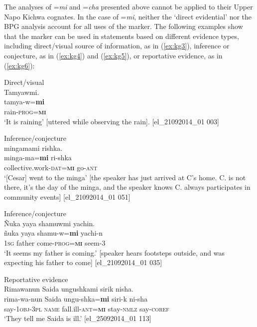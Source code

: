 \documentclass[output=paper]{langscibook}
\begin{document}
The analyses of =\textit{mi} and =\textit{cha} presented above cannot be applied to their Upper Napo Kichwa cognates. In the case of =\textit{mi}, neither the ‘direct evidential’ nor the BPG analysis account for all uses of the marker. The following examples show that the marker can be used in statements based on different evidence types, including direct/visual source of information, as in (\ref{ex:kg3}), inference or conjecture, as in (\ref{ex:kg4}) and (\ref{ex:kg5}), or reportative evidence, as in (\ref{ex:kg6}):

\begin{exe}
	\ex Direct/visual\label{ex:kg3}\\
	\glll Tamyawmi.\\
	tamya-w=\textbf{mi}\\
	rain-\textsc{prog}=\textbf{\textsc{mi}}\\
	\trans ‘It is raining’ [uttered while observing the rain]. [el\_21092014\_01 003]
\end{exe}

\begin{exe}
	\ex Inference/conjecture\label{ex:kg4}\\
	\glll [Cesar] mingamami rishka.\\
	[Cesar] minga-ma=\textbf{mi} ri-shka\\
	[Cesar] collective.work-\textsc{dat}=\textbf{\textsc{mi}} go-\textsc{ant}\\
	\trans ‘[Cesar] went to the minga’ [the speaker has just arrived at C’s home. C. is not there, it’s the day of the minga, and the speaker knows C. always participates in community events] [el\_21092014\_01 051]
\end{exe}

\begin{exe}
	\ex Inference/conjecture\label{ex:kg5}\\
	\glll Ñuka yaya shamuwmi yachin.\\
	ñuka yaya shamu-w=\textbf{mi} yachi-n \\
	1\textsc{sg} father come-\textsc{prog}=\textbf{\textsc{mi}} seem-3\\
	\trans ‘It seems my father is coming.’ [speaker hears footsteps outside, and was expecting his father to come] [el\_21092014\_01 035]
\end{exe}

\begin{exe}
	\ex Reportative evidence\label{ex:kg6}\\
	\glll Rimawanun Saida ungushkami sirik nisha.\\
	rima-wa-nun Saida ungu-shka=\textbf{mi} siri-k ni-sha\\
	say-1\textsc{obj}-3\textsc{pl} \textsc{name} fall.ill-\textsc{ant}=\textbf{\textsc{mi}} stay-\textsc{nmlz} say-\textsc{coref}\\
	\trans ‘They tell me Saida is ill.’ [el\_25092014\_01 113]
\end{exe}
\end{document}
